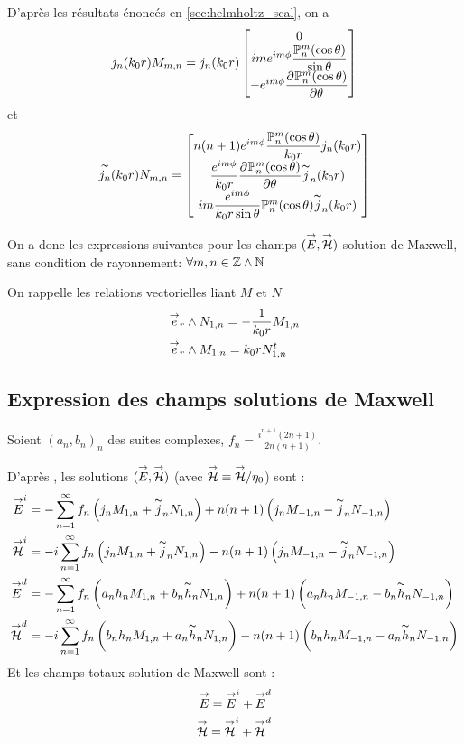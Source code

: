 D'après les résultats énoncés en \ref{sec:helmholtz_scal}, on a
\[
  j_n(k_0r)M_{m,n} = j_n(k_0r)
  \begin{bmatrix}
    0\\
    ime^{im\phi}\dfrac{\mathbb{P}^m_n(\cos\theta)}{\sin\theta}\\
    -e^{im\phi}\dfrac{\partial^{{}} \mathbb{P}^m_n(\cos\theta)}{{\partial \theta}^{{}}}\\
  \end{bmatrix}
\]
et 
\[
  \overset{\thicksim}{j_n}(k_0r)N_{m,n}=
    \begin{bmatrix}
    n(n+1)e^{im\phi}\dfrac{\mathbb{P}^m_n(\cos\theta)}{k_0r}j_n(k_0r)\\
    \dfrac{e^{im\phi}}{k_0r}\dfrac{\partial^{{}} \mathbb{P}^m_n(\cos\theta)}{{\partial \theta}^{{}}}\overset{\thicksim}{j}_n(k_0r)\\
    im\dfrac{e^{im\phi}}{k_0r\sin\theta}\mathbb{P}^m_n(\cos\theta)\overset{\thicksim}{j}_n(k_0r)
  \end{bmatrix}
\]

On a donc les expressions suivantes pour les champs \(({\overset{\rightarrow}{E}},{\overset{\rightarrow}{\mathcal{H}}})\) solution de Maxwell, sans condition de rayonnement:
\(\forall m,n \in \mathbb Z\wedge\mathbb N\)




On rappelle les relations vectorielles liant \(M\) et \(N\)
\begin{align*}
  &{\overset{\rightarrow}{e}}_r \wedge N_{1,n} = -\dfrac{1}{k_0r}M_{1,n} \\
  &{\overset{\rightarrow}{e}}_r \wedge M_{1,n} = k_0r N_{1,n}^t
\end{align*}

\subsection{Expression des champs solutions de Maxwell}
Soient \((a_n,b_n)_n\) des suites complexes, \(f_n = \frac{i^{n+1}(2n+1)}{2n(n+1)}\).

D’après \cite{morse_methods_1953}, les solutions \(({\overset{\rightarrow}{E}},{\overset{\rightarrow}{\mathcal{H}}})\) (avec \({\overset{\rightarrow}{\mathcal{H}}} \equiv {\overset{\rightarrow}{\mathcal{H}}} /\eta_0 \)) sont :
\begin{align*}
  {\overset{\rightarrow}{E}}^i &= -\sum_{n=1}^\infty f_n \left( j_nM_{1,n} + \overset{\thicksim}{j}_n N_{1,n} \right) + n(n+1)\left(j_n M_{-1,n} - \overset{\thicksim}{j}_nN_{-1,n} \right)\\
  {\overset{\rightarrow}{\mathcal{H}}}^i &= -i\sum_{n=1}^\infty f_n \left( j_nM_{1,n} + \overset{\thicksim}{j}_nN_{1,n} \right) - n(n+1)\left(j_n M_{-1,n} - \overset{\thicksim}{j}_n N_{-1,n} \right)\\
  {\overset{\rightarrow}{E}}^d &= -\sum_{n=1}^\infty f_n \left( a_n h_nM_{1,n} + b_n\overset{\thicksim}{h}_nN_{1,n} \right) + n(n+1)\left(a_nh_nM_{-1,n} - b_n\overset{\thicksim}{h}_nN_{-1,n} \right)\\
  {\overset{\rightarrow}{\mathcal{H}}}^d &= -i\sum_{n=1}^\infty f_n \left( b_nh_nM_{1,n} + a_n\overset{\thicksim}{h}_nN_{1,n} \right) - n(n+1)\left(b_nh_nM_{-1,n} - a_n\overset{\thicksim}{h}_nN_{-1,n} \right)\\
\end{align*}
Et les champs totaux solution de Maxwell sont : 
\begin{align}
  {\overset{\rightarrow}{E}} = {\overset{\rightarrow}{E}}^i + {\overset{\rightarrow}{E}}^d\label{eq:solEmie}\\
  {\overset{\rightarrow}{\mathcal{H}}} = {\overset{\rightarrow}{\mathcal{H}}}^i + {\overset{\rightarrow}{\mathcal{H}}}^d\label{eq:solHmie}
\end{align}

